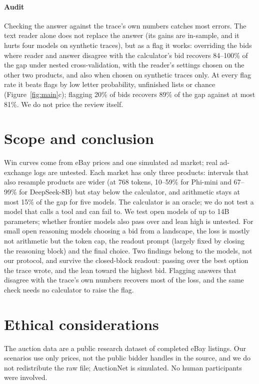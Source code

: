 \documentclass[sigconf,review,anonymous]{acmart}
\begin{document}
\paragraph{Audit}
Checking the answer against the trace's own numbers catches most errors. The text reader alone does not replace the answer (its gains are in-sample, and it hurts four models on synthetic traces), but as a flag it works: overriding the bids where reader and answer disagree with the calculator's bid recovers 84--100\% of the gap under nested cross-validation, with the reader's settings chosen on the other two products, and also when chosen on synthetic traces only. At every flag rate it beats flags by low letter probability, unfinished lists or chance (Figure~\ref{fig:main}c); flagging 20\% of bids recovers 89\% of the gap against at most 81\%. We do not price the review itself.

\section{Scope and conclusion}
\label{sec:proxy}
Win curves come from eBay prices and one simulated ad market; real ad-exchange logs are untested. Each market has only three products: intervals that also resample products are wider (at 768 tokens, 10--59\% for Phi-mini and 67--99\% for DeepSeek-8B) but stay below the calculator, and arithmetic stays at most 15\% of the gap for five models. The calculator is an oracle; we do not test a model that calls a tool and can fail to. We test open models of up to 14B parameters; whether frontier models also pass over and lean high is untested. For small open reasoning models choosing a bid from a landscape, the loss is mostly not arithmetic but the token cap, the readout prompt (largely fixed by closing the reasoning block) and the final choice. Two findings belong to the models, not our protocol, and survive the closed-block readout: passing over the best option the trace wrote, and the lean toward the highest bid. Flagging answers that disagree with the trace's own numbers recovers most of the loss, and the same check needs no calculator to raise the flag.

\section*{Ethical considerations}
The auction data are a public research dataset of completed eBay listings. Our scenarios use only prices, not the public bidder handles in the source, and we do not redistribute the raw file; AuctionNet is simulated. No human participants were involved.



\end{document}

